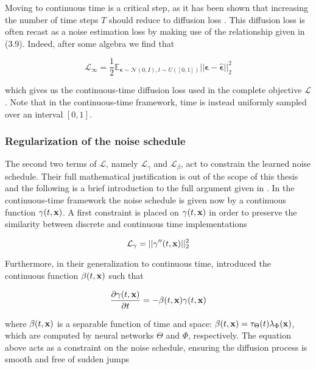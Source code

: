 Moving to continuous time is a critical step, as it has been shown that increasing the number of time steps $T$ should reduce to diffusion loss \parencite{Kingma2023}. This diffusion loss is often recast as a noise estimation loss by making use of the relationship given in (3.9). Indeed, after some algebra we find that

\begin{equation*}
\mathcal{L}_\infty = \frac{1}{2} \mathbb{E}_{\boldsymbol{\epsilon} \sim \mathcal{N}(0,I),t \sim U([0,1])} \lvert\lvert \boldsymbol{\epsilon} - \hat{\boldsymbol{\epsilon}} \lvert\lvert_{2}^{2}
\end{equation*}

which gives us the continuous-time diffusion loss used in the complete objective $\mathcal{L}$. Note that in the continuous-time framework, time is instead uniformly sampled over an interval $[0,1]$. 

\subsubsection{Regularization of the noise schedule}

The second two terms of $\mathcal{L}$, namely $\mathcal{L}_{\gamma}$ and $\mathcal{L}_{\beta}$, act to constrain the learned noise schedule. Their full mathematical justification is out of the scope of this thesis and the following is a brief introduction to the full argument given in \parencite{Maggiora2023}. In the continuous-time framework the noise schedule is given now by a continuous function $\gamma(t,\bold{x})$. A first constraint is placed on $\gamma(t,\bold{x})$ in order to preserve the similarity between discrete and continuous time implementations 

\begin{equation*}
\mathcal{L}_{\gamma} = \lvert\lvert \gamma''(t,\bold{x}) \lvert\lvert_{2}^{2}
\end{equation*}

Furthermore, in their generalization to continuous time, \parencite{Maggiora2023} introduced the continuous function $\beta(t,\bold{x})$ such that

\begin{equation*}
\frac{\partial \gamma(t,\bold{x})}{\partial t} = -\beta(t,\bold{x})\gamma(t,\bold{x})
\end{equation*}

where $\beta(t,\bold{x})$ is a separable function of time and space: $\beta(t,\bold{x}) = \tau_{\Theta}(t)\lambda_{\Phi}(\bold{x})$, which are computed by neural networks $\Theta$ and $\Phi$, respectively. The equation above acts as a constraint on the noise schedule,    ensuring the diffusion process is smooth and free of sudden jumps

